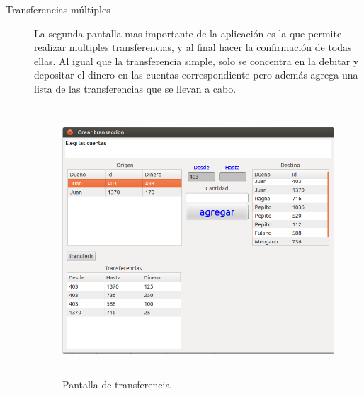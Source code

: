 \begin{description}
	\item[Transferencias múltiples]
		La segunda pantalla mas importante de la aplicación es la que permite realizar
		multiples transferencias, y al final hacer la confirmación de todas ellas. Al
		igual que la transferencia simple, solo se concentra en la debitar y depositar
		el dinero en las cuentas correspondiente pero además agrega una lista
		de las transferencias que se llevan a cabo.
	
		\begin{figure}[h]
			\centering
			\includegraphics[width=450px, height=380px]{img/multTransferencias}
			\caption{Pantalla de transferencia}
			\label{trasferenciaSimple}
		\end{figure}
		
\end{description}